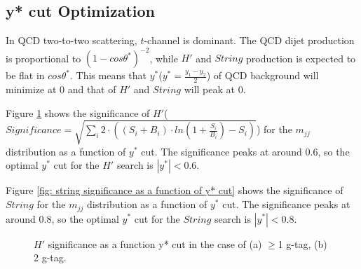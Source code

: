 \subsection{y* cut Optimization}
\label{section: y* cut optimization}

In QCD two-to-two scattering, $t$-channel is dominant. The QCD dijet production is proportional to $(1-cos\theta^{*})^{-2}$, while $H'$ and $String$ production is expected to be flat in $cos\theta^{*}$.
This means that $y^{*}$($y^{*} = \frac{y_{1}-y_{2}}{2}$) of QCD background will minimize at 0 and that of $H'$ and $String$ will peak at 0.

Figure \ref{fig: hprime significance as a function of y* cut} shows the significance of $H'$($Significance = \sqrt{\sum_{i}{2\cdot((S_{i}+B_{i})\cdot ln(1+\frac{S_{i}}{B_{i}})-S_{i})}}$) for the $m_{jj}$ distribution as a function of $y^{*}$ cut. The significance peaks at around 0.6, so the optimal $y^{*}$ cut for the $H'$ search is $|y^{*}| < 0.6$.

Figure \ref{fig: string significance as a function of y* cut} shows the significance of $String$ for the $m_{jj}$ distribution as a function of $y^{*}$ cut. The significance peaks at around 0.8, so the optimal $y^{*}$ cut for the $String$ search is $|y^{*}| < 0.8$.

\begin{figure}[htbp]
        \centering
        \caption{$H'$ significance as a function y* cut in the case of (a) $\geq$1 g-tag, (b) 2 g-tag.}
        \label{fig: hprime significance as a function of y* cut}
\end{figure}


